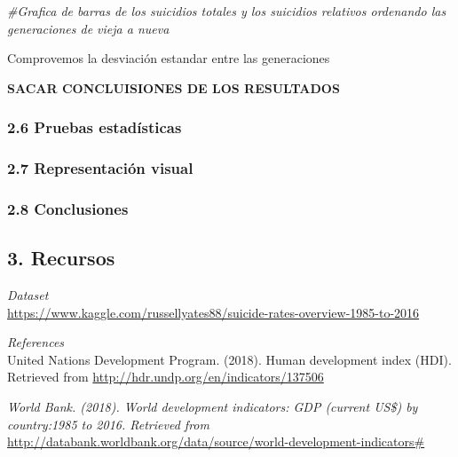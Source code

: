 \documentclass[]{article}
\newenvironment{Shaded}{\begin{snugshade}}{\end{snugshade}}
\newcommand{\CommentTok}[1]{\textcolor[rgb]{0.56,0.35,0.01}{\textit{#1}}}
\begin{document}
\begin{Shaded}
\begin{Highlighting}[]
\CommentTok{#Grafica de barras de los suicidios totales y los suicidios relativos ordenando las generaciones de vieja a nueva}
\end{Highlighting}
\end{Shaded}

Comprovemos la desviación estandar entre las generaciones

\begin{Shaded}
\end{Shaded}

\textbf{SACAR CONCLUISIONES DE LOS RESULTADOS}

\hypertarget{pruebas-estadisticas}{%
\subsubsection{2.6 Pruebas estadísticas}\label{pruebas-estadisticas}}

\hypertarget{representacion-visual}{%
\subsubsection{2.7 Representación visual}\label{representacion-visual}}

\hypertarget{conclusiones}{%
\subsubsection{2.8 Conclusiones}\label{conclusiones}}

\hypertarget{recursos}{%
\subsection{3. Recursos}\label{recursos}}

\emph{Dataset}\\
\url{https://www.kaggle.com/russellyates88/suicide-rates-overview-1985-to-2016}

\emph{References}\\
United Nations Development Program. (2018). Human development index
(HDI). Retrieved from \url{http://hdr.undp.org/en/indicators/137506}

\emph{World Bank. (2018). World development indicators: GDP (current
US\$) by country:1985 to 2016. Retrieved from}
\url{http://databank.worldbank.org/data/source/world-development-indicators\#}
\end{document}
